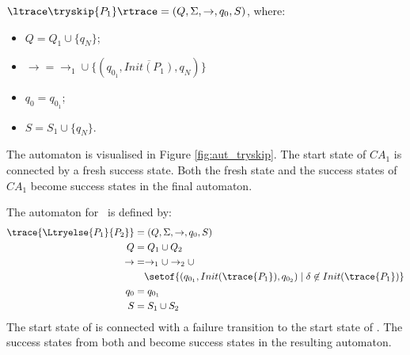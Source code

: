 

\begin{definition}
$\ltrace \tryskip{P_1} \rtrace = ( Q, \Sigma, \rightarrow, q_0, S)$, where:\\
\begin{itemize}
\item $Q = Q_{1} \cup \{ q_N \}$;
\item $\rightarrow = \rightarrow_{1} \cup \{(q_{0_1},\overline{Init(P_1)},q_N)\}$
\item $q_0 = q_{0_1}$;
\item $S = S_1 \cup \{ q_N \} $.
\end{itemize}
\end {definition}

The automaton is visualised in Figure \ref{fig:aut_tryskip}. The start state of $CA_1$ is connected by a fresh success state. Both the fresh state and the success states of $CA_1$ become success states in the final automaton. 


\fi
\iffull
The automaton for ~is defined by:
\begin{align*}
\trace{\Ltryelse{P_1}{P_2}} &= ( Q, \Sigma, \rightarrow, q_0, S)\\
Q &= Q_1 \cup Q_2\\
{\rightarrow} &= \rightarrow_{1} \cup \rightarrow_{2} \cup\\
 & \quad \setof{(q_{0_1},Init(\trace{P_1}),q_{0_2}) \mid \delta \not\in Init(\trace{P_1}) }\\
q_0 &= q_{0_1}\\
S &= S_1 \cup S_2\\
\end {align*}
The start state of  is connected with a failure transition to the start state of . The success states from both  and  become success states in the resulting automaton.
\fi
\iffull

